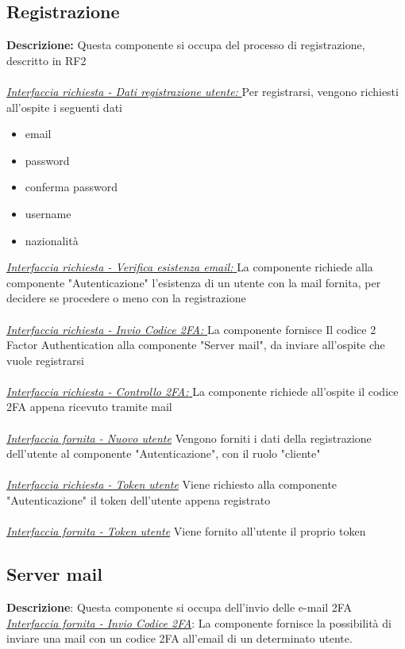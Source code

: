 \documentclass{report}
\begin{document}
\subsection*{Registrazione}
\textbf{Descrizione: } Questa componente si occupa del processo di registrazione, descritto in RF2
\\ \\ \uline{\textit{Interfaccia richiesta - Dati registrazione utente: }}Per registrarsi, vengono richiesti all'ospite i seguenti dati
\begin{itemize}
	\item email
	\item password
	\item conferma password
	\item username
	\item nazionalità
\end{itemize}
\uline{\textit{Interfaccia richiesta - Verifica esistenza email: }}La componente richiede alla componente "Autenticazione" l'esistenza di un utente con la mail fornita,
per decidere se procedere o meno con la registrazione
\\ \\ \uline{\textit{Interfaccia richiesta - Invio Codice 2FA: }} La componente fornisce Il codice 2 Factor Authentication alla componente "Server mail", da inviare all'ospite che vuole registrarsi
\\ \\ \uline{\textit{Interfaccia richiesta - Controllo 2FA: }} La componente richiede all'ospite il codice 2FA appena ricevuto tramite mail
\\ \\ \uline{\textit{Interfaccia fornita - Nuovo utente}} Vengono forniti i dati della registrazione dell'utente al componente "Autenticazione", con il ruolo "cliente"
\\ \\ \uline{\textit{Interfaccia richiesta - Token utente}} Viene richiesto alla componente "Autenticazione" il token dell'utente appena registrato
\\ \\ \uline{\textit{Interfaccia fornita - Token utente}} Viene fornito all'utente il proprio token

\subsection*{Server mail}
\textbf{Descrizione}: Questa componente si occupa dell'invio delle e-mail 2FA \\
\uline{\textit{Interfaccia fornita - Invio Codice 2FA}}:
La componente fornisce la possibilità di inviare una mail con un codice 2FA all'email di un determinato utente.
\end{document}
